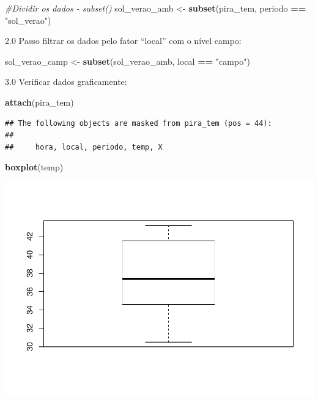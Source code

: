 \documentclass[
]{book}
\newenvironment{Shaded}{\begin{snugshade}}{\end{snugshade}}
\newcommand{\CommentTok}[1]{\textcolor[rgb]{0.56,0.35,0.01}{\textit{#1}}}
\newcommand{\KeywordTok}[1]{\textcolor[rgb]{0.13,0.29,0.53}{\textbf{#1}}}
\newcommand{\NormalTok}[1]{#1}
\newcommand{\OperatorTok}[1]{\textcolor[rgb]{0.81,0.36,0.00}{\textbf{#1}}}
\newcommand{\StringTok}[1]{\textcolor[rgb]{0.31,0.60,0.02}{#1}}
\begin{document}
\begin{Shaded}
\begin{Highlighting}[]
 \CommentTok{#Dividir os dados - subset()}
\NormalTok{    sol_verao_amb <-}\StringTok{ }\KeywordTok{subset}\NormalTok{(pira_tem, periodo }\OperatorTok{==}\StringTok{ "sol_verao"}\NormalTok{)}
\end{Highlighting}
\end{Shaded}

2.0 Passo filtrar os dados pelo fator ``local'' com o nível campo:

\begin{Shaded}
\begin{Highlighting}[]
\NormalTok{ sol_verao_camp <-}\StringTok{ }\KeywordTok{subset}\NormalTok{(sol_verao_amb, local }\OperatorTok{==}\StringTok{ "campo"}\NormalTok{)}
\end{Highlighting}
\end{Shaded}

3.0 Verificar dados graficamente:

\begin{Shaded}
\begin{Highlighting}[]
\KeywordTok{attach}\NormalTok{(pira_tem)}
\end{Highlighting}
\end{Shaded}

\begin{verbatim}
## The following objects are masked from pira_tem (pos = 44):
## 
##     hora, local, periodo, temp, X
\end{verbatim}

\begin{Shaded}
\begin{Highlighting}[]
\KeywordTok{boxplot}\NormalTok{(temp)}
\end{Highlighting}
\end{Shaded}

\includegraphics{TudodoR_files/figure-latex/unnamed-chunk-250-1.pdf}
\end{document}
